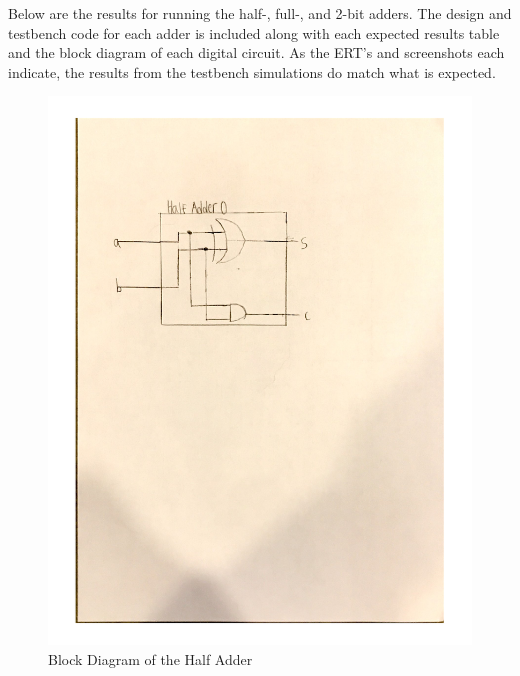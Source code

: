\documentclass[11pt]{article}
\begin{document}
Below are the results for running the half-, full-, and 2-bit adders. The design and testbench code for each adder is included along with each expected results table and the block diagram of each digital circuit. As the ERT's and screenshots each indicate, the results from the testbench simulations do match what is expected.
\begin{figure}
	\includegraphics[width=1.0\textwidth]{"HalfAdderDia"}
	\caption{Block Diagram of the Half Adder}
\end{figure}
\clearpage
\end{document}
